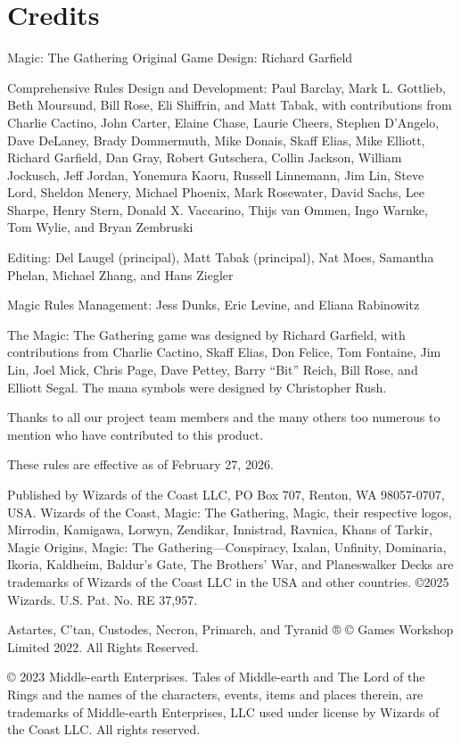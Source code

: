 \chapter*{Credits}
{}

Magic: The Gathering Original Game Design: Richard Garfield

Comprehensive Rules Design and Development: Paul Barclay, Mark L. Gottlieb, Beth Moursund, Bill Rose, Eli Shiffrin, and Matt Tabak, with contributions from Charlie Cactino, John Carter, Elaine Chase, Laurie Cheers, Stephen D’Angelo, Dave DeLaney, Brady Dommermuth, Mike Donais, Skaff Elias, Mike Elliott, Richard Garfield, Dan Gray, Robert Gutschera, Collin Jackson, William Jockusch, Jeff Jordan, Yonemura Kaoru, Russell Linnemann, Jim Lin, Steve Lord, Sheldon Menery, Michael Phoenix, Mark Rosewater, David Sachs, Lee Sharpe, Henry Stern, Donald X. Vaccarino, Thijs van Ommen, Ingo Warnke, Tom Wylie, and Bryan Zembruski

Editing: Del Laugel (principal), Matt Tabak (principal), Nat Moes, Samantha Phelan, Michael Zhang, and Hans Ziegler

Magic Rules Management: Jess Dunks, Eric Levine, and Eliana Rabinowitz

The Magic: The Gathering game was designed by Richard Garfield, with contributions from Charlie Cactino, Skaff Elias, Don Felice, Tom Fontaine, Jim Lin, Joel Mick, Chris Page, Dave Pettey, Barry “Bit” Reich, Bill Rose, and Elliott Segal. The mana symbols were designed by Christopher Rush.

Thanks to all our project team members and the many others too numerous to mention who have contributed to this product.

These rules are effective as of February 27, 2026.

Published by Wizards of the Coast LLC, PO Box 707, Renton, WA 98057-0707, USA. Wizards of the Coast, Magic: The Gathering, Magic, their respective logos, Mirrodin, Kamigawa, Lorwyn, Zendikar, Innistrad, Ravnica, Khans of Tarkir, Magic Origins, Magic: The Gathering—Conspiracy, Ixalan, Unfinity, Dominaria, Ikoria, Kaldheim, Baldur’s Gate, The Brothers’ War, and Planeswalker Decks are trademarks of Wizards of the Coast LLC in the USA and other countries. ©2025 Wizards. U.S. Pat. No. RE 37,957.

Astartes, C’tan, Custodes, Necron, Primarch, and Tyranid ® © Games Workshop Limited 2022. All Rights Reserved.

© 2023 Middle-earth Enterprises. Tales of Middle-earth and The Lord of the Rings and the names of the characters, events, items and places therein, are trademarks of Middle-earth Enterprises, LLC used under license by Wizards of the Coast LLC. All rights reserved.

